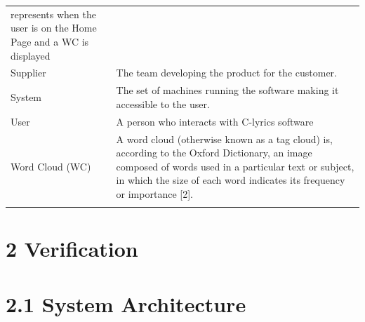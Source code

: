 \documentclass[]{article}
\begin{document}
\begin{longtable}[c]{@{}ll@{}}
\begin{minipage}[t]{0.47\columnwidth}
represents when the user is on the Home Page and a WC is displayed
\end{minipage}
\\\addlinespace
\begin{minipage}[t]{0.47\columnwidth}\raggedright
Supplier
\end{minipage} & \begin{minipage}[t]{0.47\columnwidth}\raggedright
The team developing the product for the customer.
\end{minipage}
\\\addlinespace
\begin{minipage}[t]{0.47\columnwidth}\raggedright
System
\end{minipage} & \begin{minipage}[t]{0.47\columnwidth}\raggedright
The set of machines running the software making it accessible to the
user.
\end{minipage}
\\\addlinespace
\begin{minipage}[t]{0.47\columnwidth}\raggedright
User
\end{minipage} & \begin{minipage}[t]{0.47\columnwidth}\raggedright
A person who interacts with C-lyrics software
\end{minipage}
\\\addlinespace
\begin{minipage}[t]{0.47\columnwidth}\raggedright
Word Cloud (WC)
\end{minipage} & \begin{minipage}[t]{0.47\columnwidth}\raggedright
A word cloud (otherwise known as a tag cloud) is, according to the
Oxford Dictionary, an image composed of words used in a particular text
or subject, in which the size of each word indicates its frequency or
importance {[}2{]}.
\end{minipage}
\\\addlinespace
\bottomrule
\end{longtable}

\section{\textbf{2 Verification}}\label{verification}

\section{\textbf{2.1 System Architecture}}\label{system-architecture}
\end{document}
